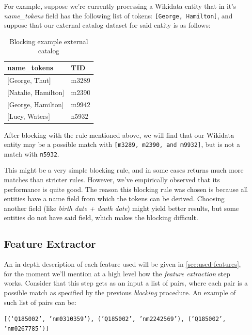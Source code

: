 \documentclass[epsfig,a4paper,11pt,titlepage,twoside,openany]{book}
\begin{document}
For example, suppose we're currently processing a Wikidata entity that in it's \textit{name\_tokens} field has the following list of tokens: \texttt{[George, Hamilton]}, and suppose that our external catalog dataset for said entity is as follows:

\begin{table}[H]
\centering
\begin{tabular}{l|l}
name\_tokens        & TID   \\ \hline
{[George, Thut]}      & m3289 \\
{[Natalie, Hamilton]} & m2390 \\
{[George, Hamilton]}  & m9942 \\
{[Lucy, Waters]}      & n5932
\end{tabular}
\caption{Blocking example external catalog}
\label{tab:soweego-blocking-ex}
\end{table}

After blocking with the rule mentioned above, we will find that our Wikidata entity may be a possible match with \texttt{[m3289, m2390, and m9932]}, but is not a match with \texttt{n5932}.

This might be a very simple blocking rule, and in some cases returns much more matches than stricter rules. However, we've empirically observed that its performance is quite good. The reason this blocking rule was chosen is because all entities have a name field from which the tokens can be derived. Choosing another field (like \textit{birth date + death date}) might yield better results, but some entities do not have said field, which makes the blocking difficult. 


\subsection{Feature Extractor}
\label{sec:soweego-st-feature-ext}


An in depth description of each feature used will be given in \autoref{sec:used-features}, for the moment we'll mention at a high level how the \textit{feature extraction} step works. Consider that this step gets as an input a list of pairs, where each pair is a possible match as specified by the previous \textit{blocking} procedure. An example of such list of pairs can be: 

\begin{center}
    \texttt{[('Q185002', 'nm0310359'), ('Q185002', 'nm2242569'), ('Q185002', 'nm0267785')]}
\end{center}
\end{document}
